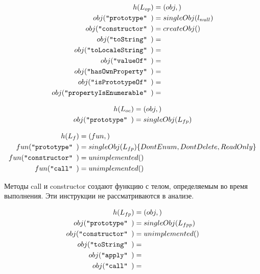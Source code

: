 \[
\begin{aligned}
  h(L_{op})  &= (obj, ) \\ 
  obj( \mbox{\texttt{``prototype''   }})   &= singleObj( l_{null} ) \\
  obj( \mbox{\texttt{``constructor'' }})   &= createObj() \\
  obj( \mbox{\texttt{``toString'' }})   &=  \\
  obj( \mbox{\texttt{``toLocaleString'' }})   &=  \\
  obj( \mbox{\texttt{``valueOf'' }})   &=  \\
  obj( \mbox{\texttt{``hasOwnProperty'' }})   &=  \\
  obj( \mbox{\texttt{``isPrototypeOf'' }})   &=  \\
  obj( \mbox{\texttt{``propertyIsEnumerable'' }})   &=  \\
\end{aligned}
\]

\[
\begin{aligned}
  h(L_{oc})  &= (obj, ) \\ 
  obj( \mbox{\texttt{``prototype''   }})   &= singleObj( L_{fp} ) \\
\end{aligned}
\]

\[
\begin{aligned}
  h(L_{f})  &= (fun, ) \\ 
  fun( \mbox{\texttt{``prototype''   }})   &= singleObj( L_{fp} ) \{
  DontEnum, DontDelete, ReadOnly \} \\
  fun( \mbox{\texttt{``constructor'' }})   &= unimplemented() \\
  fun( \mbox{\texttt{``call'' }})	   &= unimplemented() \\
\end{aligned}
\]

Методы call и constructor создают функцию с телом, определяемым во
время выполнения. Эти инструкции не рассматриваются в анализе.

\[
\begin{aligned}
  h(L_{fp})  &= (obj, ) \\ 
  obj( \mbox{\texttt{``prototype''   }})   &= singleObj( L_{fpp} ) \\
  obj( \mbox{\texttt{``constructor'' }})   &= unimplemented() \\
  obj( \mbox{\texttt{``toString'' }})   &=  \\
  obj( \mbox{\texttt{``apply'' }})   &=  \\
  obj( \mbox{\texttt{``call'' }})   &=  \\
\end{aligned}
\]

